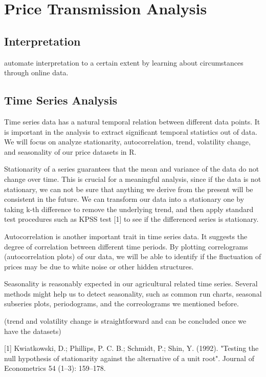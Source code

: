 \section*{Price Transmission Analysis}

\subsection*{Interpretation}
automate interpretation to a certain extent by learning about circumstances through online data.

\subsection*{Time Series Analysis}
Time series data has a natural temporal relation between different data points.
It is important in the analysis to extract significant temporal statistics out
of data. We will focus on analyze stationarity, autocorrelation, trend, volatility
change, and seasonality of our price datasets in R.

Stationarity of a series guarantees that the mean and variance of the data do not
change over time. This is crucial for a meaningful analysis, since if the data is
not stationary, we can not be sure that anything we derive from the present will
be consistent in the future. We can transform our data into a stationary one by
taking k-th difference to remove the underlying trend, and then apply standard
test procedures such as KPSS test [1] to see if the differenced series is stationary.

Autocorrelation is another important trait in time series data. It suggests the
degree of correlation between different time periods. By plotting correlograms
(autocorrelation plots) of our data, we will be able to identify if the fluctuation
of prices may be due to white noise or other hidden structures.

Seasonality is reasonably expected in our agricultural related time series. Several
methods might help us to detect seasonality, such as common run charts, seasonal
subseries plots, periodograms, and the correolograms we mentioned before.

(trend and volatility change is straightforward and can be concluded once we have the datasets)

[1] Kwiatkowski, D.; Phillips, P. C. B.; Schmidt, P.; Shin, Y. (1992). "Testing the null hypothesis of stationarity against the alternative of a unit root". Journal of Econometrics 54 (1–3): 159–178.


